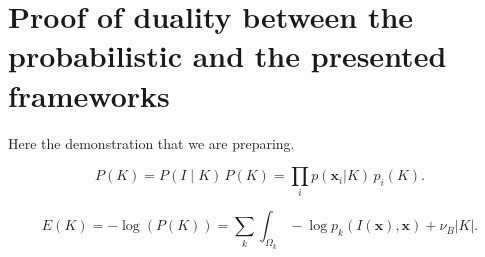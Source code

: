 
%

\appendices

\section{Proof of duality between the probabilistic and the presented frameworks}
Here the demonstration that we are preparing.


\begin{equation}
P(K)=P(I \mid K)\, P(K)=\underset{i}{\prod} p (\mathbf{x}_i | K ) \, p_i(K).
\end{equation}

\begin{equation}
E(K)= -\log( P(K) ) = \sum\limits_k \int_{\Omega_k} -\log p_k(I(\mathbf{x}),\mathbf{x})+\nu_B \left|K\right|.
\end{equation}